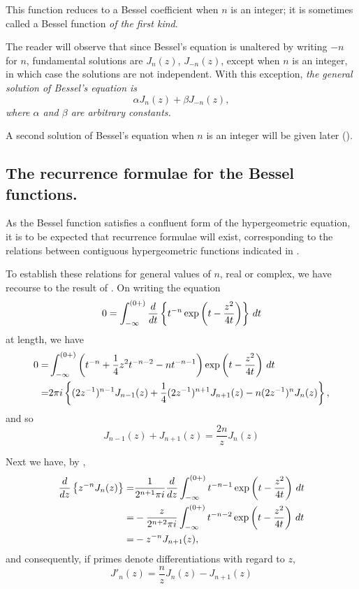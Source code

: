 \documentclass{book}
\begin{document}
This function reduces to a Bessel coefficient when $n$ is an integer;
it is sometimes called a Bessel function \emph{of the first kind}.

The reader will observe that since Bessel's equation is unaltered by
writing $-n$ for $n$, fundamental solutions are $J_n(z)$, $J_{-n}(z)$,
except when $n$ is an integer, in which case the solutions are not
independent. With this exception, \emph{the general solution of
  Bessel's equation is
$$
\alpha J_n(z) + \beta J_{-n}(z),
$$
where $\alpha$ and $\beta$ are arbitrary constants.}

A second solution of Bessel's equation when $n$ is an integer will be
given later ().

\subsection{The recurrence formulae for the Bessel functions.}
As the Bessel function satisfies a confluent form of the
hypergeometric equation, it is to be expected that recurrence formulae
will exist, corresponding to the relations between contiguous
hypergeometric functions indicated in .

To establish these relations for general values of $n$, real or
complex, we have recourse to the result of .
On writing the equation
$$
0 = \int_{-\infty}^{(0+)} \frac{d}{dt} \left\{  t^{-n}
  \exp\left(  t - \frac{z^2}{4t}   \right)   \right\} \, d t
$$
at length, we have
\begin{align*}
0 =& \int_{-\infty}^{(0+)}
\theparen{ t^{-n} + \frac{1}{4}z^2 t^{-n-2} - nt^{-n-1}  }
  \exp\theparen{ t - \frac{z^2}{4t}  }  \dmeasure t \\
%
  =& 2\pi i
  \thebrace{ (2z^{-1})^{n-1} J_{n-1}(z)
    + \frac{1}{4} (2z^{-1})^{n+1} J_{n+1}(z)
  - n (2z^{-1})^n J_n(z)},
\end{align*}
and so
\begin{equation}
J_{n-1}(z) + J_{n+1}(z) = \frac{2n}{z} J_n(z) 
\label{eq:bessel:recur}
\end{equation}

Next we have, by ,
\begin{align*}
  \frac{d}{dz} \left\{  z^{-n} J_n(z)   \right\}
  =& \frac{1}{2^{n+1}\pi i}
  \frac{d}{dz}
  \int_{-\infty}^{(0+)}
  t^{-n-1}
  \exp\left(  t - \frac{z^2}{4t}  \right)
  \, d t
  \\
  =& - \frac{z}{2^{n+2}\pi i}
  \int_{-\infty}^{(0+)}
  t^{-n-2}
  \exp\left(  t - \frac{z^2}{4t}  \right)
  \, d t
  \\
  =& -z^{-n} J_{n+1}(z),  
\end{align*}
%
%
and consequently, if primes denote differentiations with regard to
$z$,
\begin{equation}
  J'_n(z) = \frac{n}{z} J_n(z) - J_{n+1}(z)
\label{eq:bessel:deriv}
\end{equation}
\end{document}

